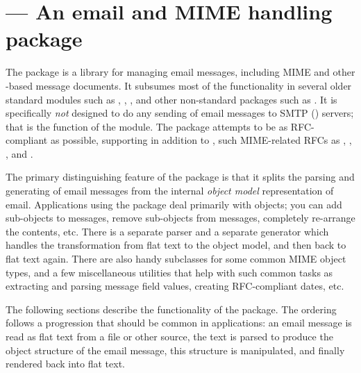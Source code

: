
\section{ ---
	 An email and MIME handling package}



The  package is a library for managing email messages,
including MIME and other -based message documents.  It
subsumes most of the functionality in several older standard modules
such as , ,
, and other non-standard packages such as
.  It is specifically \emph{not} designed to do any
sending of email messages to SMTP () servers; that is the
function of the  module.  The 
package attempts to be as RFC-compliant as possible, supporting in
addition to , such MIME-related RFCs as
, , , and .

The primary distinguishing feature of the  package is
that it splits the parsing and generating of email messages from the
internal \emph{object model} representation of email.  Applications
using the  package deal primarily with objects; you can
add sub-objects to messages, remove sub-objects from messages,
completely re-arrange the contents, etc.  There is a separate parser
and a separate generator which handles the transformation from flat
text to the object model, and then back to flat text again.  There
are also handy subclasses for some common MIME object types, and a few
miscellaneous utilities that help with such common tasks as extracting
and parsing message field values, creating RFC-compliant dates, etc.

The following sections describe the functionality of the
 package.  The ordering follows a progression that
should be common in applications: an email message is read as flat
text from a file or other source, the text is parsed to produce the
object structure of the email message, this structure is manipulated,
and finally rendered back into flat text.

